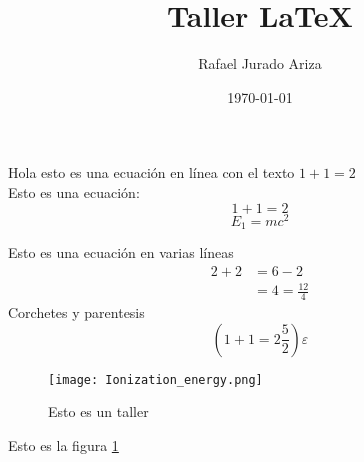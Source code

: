 \documentclass[a4paper]{article}
\title{\vspace{-1.5cm}Taller \LaTeX}
\author{Rafael Jurado Ariza}
\date{\today}
\begin{document}
    Hola esto es una ecuación en línea con el texto $1+1=2$\\
    Esto es una ecuación:
    \begin{equation} 
        1+1=2
    \end{equation}
    \begin{equation*}
        E_1=mc^2 
    \end{equation*}
    
    Esto es una ecuación en varias líneas
    \begin{align*}
        2+2&=6-2\\
        &=4=\frac{12}{4}
    \end{align*}
    Corchetes  y parentesis 
    \begin{equation*}  
        \left(1+1=2\frac{5}{2}\right)
        \varepsilon 
    \end{equation*}
    \begin{figure}
        \centering
        \texttt{[image: Ionization\_energy.png]}
        \caption{Esto es un taller}
        \label{fig:energy}
    \end{figure}
    \newpage 
    Esto es la figura \ref{fig:energy}
\end{document}
